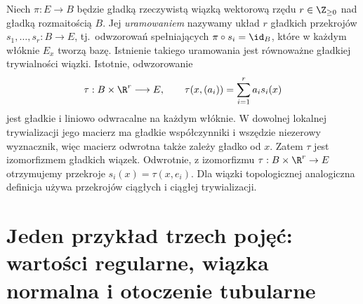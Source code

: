 \begin{definicja}
Niech $\pi:E\to B$ będzie gładką rzeczywistą
wiązką wektorową rzędu $r\in\Z_{\ge0}$
nad gładką rozmaitością $B$.
Jej \emph{uramowaniem} nazywamy układ
$r$ gładkich przekrojów $s_1,\ldots,s_r:B\to E$,
tj.\ odwzorowań spełniających $\pi\circ s_i=\id_B$,
które w każdym włóknie $E_x$ tworzą bazę.
Istnienie takiego uramowania jest równoważne
gładkiej trywialności wiązki.
Istotnie, odwzorowanie
\[
\tau:B\times\R^r\longrightarrow E,
\qquad \tau(x,(a_i))=\sum_{i=1}^r a_i s_i(x)
\]
jest gładkie i liniowo odwracalne na każdym włóknie.
W dowolnej lokalnej trywializacji jego macierz
ma gładkie współczynniki i wszędzie niezerowy
wyznacznik, więc macierz odwrotna także zależy
gładko od $x$. Zatem $\tau$ jest izomorfizmem
gładkich wiązek.
Odwrotnie, z izomorfizmu
$\tau:B\times\R^r\to E$ otrzymujemy
przekroje $s_i(x)=\tau(x,e_i)$.
Dla wiązki topologicznej analogiczna definicja
używa przekrojów ciągłych i ciągłej trywializacji.
\end{definicja}

\section{Jeden przykład trzech pojęć: wartości regularne, wiązka normalna i otoczenie tubularne}
\label{sec:at30-okrag-tubularny}

